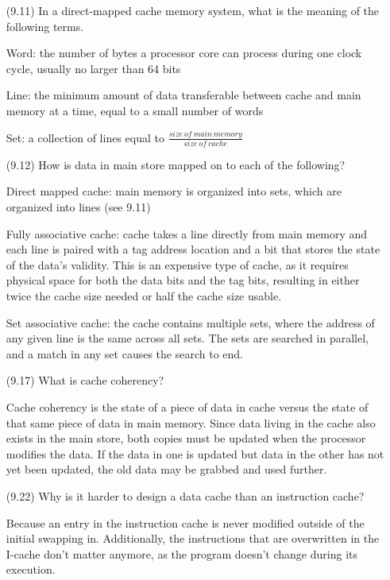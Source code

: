 \documentclass[letterpaper,10pt,titlepage]{article}
\begin{document}
\begin{enumerate}
	\item[(9.11)] In a direct-mapped cache memory system, what is the meaning of the
		following terms.
	\item[\textbullet] Word: the number of bytes a processor core can process during
		one clock cycle, usually no larger than 64 bits
	\item[\textbullet] Line: the minimum amount of data transferable between cache
		and main memory at a time, equal to a small number of words
	\item[\textbullet] Set: a collection of lines equal to $\frac{size\ of\ main\
		memory}{size\ of\ cache}$

	\item[(9.12)] How is data in main store mapped on to each of the following?
	\item[\textbullet] Direct mapped cache: main memory is organized into sets, which
		are organized into lines (see 9.11)
	\item[\textbullet] Fully associative cache: cache takes a line directly from main
		memory and each line is paired with a tag address location and a bit that
		stores the state of the data's validity. This is an expensive type of
		cache, as it requires physical space for both the data bits and the tag
		bits, resulting in either twice the cache size needed or half the cache
		size usable.
	\item[\textbullet] Set associative cache: the cache contains multiple sets, where
		the address of any given line is the same across all sets. The sets are
		searched in parallel, and a match in any set causes the search to end.

	\item[(9.17)] What is cache coherency?
	\item[\textbullet] Cache coherency is the state of a piece of data in cache versus
		the state of that same piece of data in main memory. Since data living in
		the cache also exists in the main store, both copies must be updated when
		the processor modifies the data. If the data in one is updated but data in
		the other has not yet been updated, the old data may be grabbed and used
		further.

	\item[(9.22)] Why is it harder to design a data cache than an instruction cache?
	\item[\textbullet] Because an entry in the instruction cache is never modified
		outside of the initial swapping in. Additionally, the instructions that
		are overwritten in the I-cache don't matter anymore, as the program
		doesn't change during its execution.


\end{enumerate}
\end{document}
